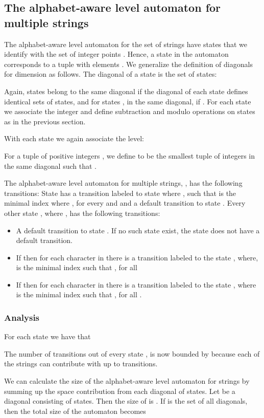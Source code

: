 \documentclass[a4paper,11pt]{article}
\begin{document}
\subsection{The alphabet-aware level automaton for multiple strings}
The alphabet-aware level automaton for the set of strings  have  states that we identify with the set of integer points . Hence, a state in the automaton corresponds to a tuple with  elements . We generalize the definition of diagonals for dimension  as follows. The diagonal of a state  is the set of states:

Again, states belong to the same diagonal if the diagonal of each state defines identical sets of states, and for states , in the same diagonal,  if . For each state  we associate the integer  and define subtraction and modulo operations on states as in the previous section.

With each state we again associate the level:


For a tuple of positive integers , we define  to be the smallest tuple of integers in the same diagonal such that .


The alphabet-aware level automaton for multiple strings, , has the following transitions: State  has a transition labeled  to state  where , such that  is the minimal index where , for every  and  and a default transition to state .
Every other state , where , has the following transitions:
\begin{itemize}
\item A default transition to state . If no such state exist, the state  does not have a default transition.
\item If  then for each character  in   there is a transition labeled  to the state , where,  is the minimal index such that , for all 
\item If  then for each character  in  there is a transition labeled  to the state , where  is the minimal index such that , for all .
\end{itemize}

\subsubsection{Analysis}
For each state  we have that 


The number of transitions out of every state , is now bounded by  because each of the  strings can contribute with up to  transitions.

 We can calculate the size of the alphabet-aware level automaton for  strings by summing up the space contribution from each diagonal of states. Let  be a diagonal consisting of  states. Then the size of  is . If  is the set of all diagonals, then the total size of the automaton becomes
\end{document}
